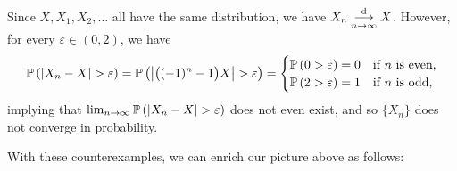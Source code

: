 \begin{enumerate}
\begin{enumerate}[label={(\arabic*)}]
\begin{pf}
Since \(X,X_1,X_2,\dotsc\) all have the same distribution, we have \(X_n\underset{n\to\infty}{\overset{\text{d}}{\longrightarrow}}
X\). However, for every \(\varepsilon\in (0,2)\), we have
\[
\prob{|X_n-X|>\varepsilon}=\prob{\left|\bigl((-1)^{n}-1\bigr)X\right|>\varepsilon}
=\begin{cases}
\prob{0>\varepsilon}=0&\text{if \(n\) is even,} \\
\prob{2>\varepsilon}=1&\text{if \(n\) is odd,}
\end{cases}
\]
implying that \(\lim_{n\to\infty}\prob{|X_n-X|>\varepsilon}\) does not even exist,
and so \(\{X_n\}\) does not converge in probability.
\end{pf}
\end{enumerate}
With these counterexamples, we can enrich our picture above as follows:
\begin{center}
\end{center}
\end{enumerate}
